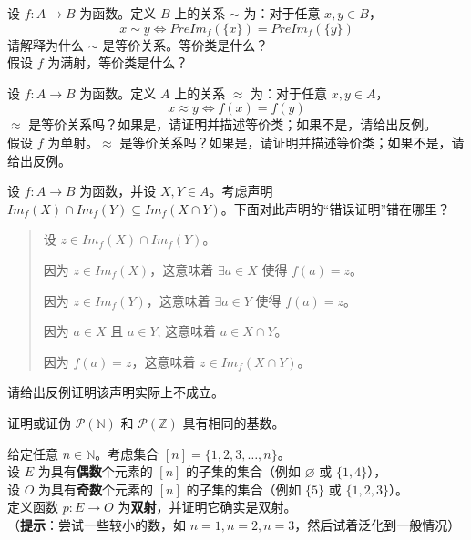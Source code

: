 \begin{exercise}
    设 $f : A \to B$ 为函数。定义 $B$ 上的关系 $\sim$ 为：对于任意 $x,y \in B$，
    \[x \sim y \iff PreIm_f (\{x\}) = PreIm_f (\{y\})\]
    请解释为什么 $\sim$ 是等价关系。等价类是什么？\\
    假设 $f$ 为满射，等价类是什么？
\end{exercise}

\begin{exercise}
    设 $f : A \to B$ 为函数。定义 $A$ 上的关系 $\approx$ 为：对于任意 $x,y \in A$，
    \[x \approx y \iff f(x) = f(y)\]
    $\approx$ 是等价关系吗？如果是，请证明并描述等价类；如果不是，请给出反例。\\
    假设 $f$ 为单射。$\approx$ 是等价关系吗？如果是，请证明并描述等价类；如果不是，请给出反例。
\end{exercise}

\begin{exercise}
    设 $f : A \to B$ 为函数，并设 $X,Y \in A$。考虑声明 $Im_f (X) \cap Im_f (Y) \subseteq Im_f (X \cap Y )$。下面对此声明的``错误证明''错在哪里？
    \begin{quote}
        \begin{spoof}
            设 $z \in Im_f (X) \cap Im_f (Y)$。

            因为 $z \in Im_f (X)$，这意味着 $\exists a \in X$ 使得 $f(a) = z$。

            因为 $z \in Im_f (Y)$，这意味着 $\exists a \in Y$ 使得 $f(a) = z$。

            因为 $a \in X$ 且 $a \in Y$, 这意味着 $a \in X \cap Y$。

            因为 $f(a) = z$，这意味着 $z \in Im_f (X \cap Y)$。
        \end{spoof}
    \end{quote}
    请给出反例证明该声明实际上不成立。
\end{exercise}

\begin{exercise}
    证明或证伪 $\mathcal{P}(\mathbb{N})$ 和 $\mathcal{P}(\mathbb{Z})$ 具有相同的基数。
\end{exercise}

\begin{exercise}
    给定任意 $n \in \mathbb{N}$。考虑集合 $[n] = \{1, 2, 3, \dots , n\}$。\\
    设 $E$ 为具有\textbf{偶数}个元素的 $[n]$ 的子集的集合（例如 $\varnothing$ 或 $\{1,4\}$），\\
    设 $O$ 为具有\textbf{奇数}个元素的 $[n]$ 的子集的集合（例如 $\{5\}$ 或 $\{1,2,3\}$）。\\
    定义函数 $p : E \to O$ 为\textbf{双射}，并证明它确实是双射。\\
    （\textbf{提示}：尝试一些较小的数，如 $n = 1, n = 2, n = 3$，然后试着泛化到一般情况）
\end{exercise}


